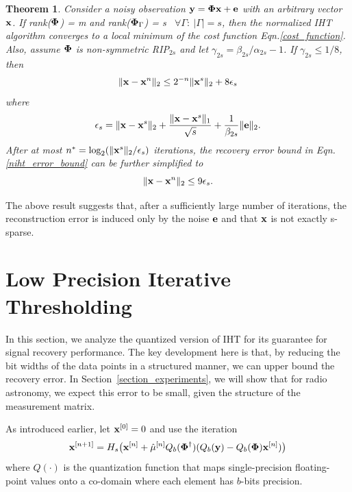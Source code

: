 \documentclass{article}
\newtheorem{theorem}{Theorem}
\begin{document}
\begin{theorem}\label{guarantee_niht}
{\rm{\cite{blumensath2010niht}}}
Consider a noisy observation ${\bf y} = {\bf \Phi x} + {\bf e}$ with an arbitrary vector ${\bf x}$. If rank({${\bf \Phi}$}) = m and rank(${\bf \Phi}_{\Gamma}$) = s \ $\forall \Gamma:\ |\Gamma| = s$, then the normalized IHT algorithm converges to a local minimum of the cost function Eqn.\ref{cost_function}. Also, assume ${\bf \Phi}$ is non-symmetric RIP$_{2s}$ and let $\gamma_{2s} = \beta_{2s}/\alpha_{2s}-1$. If $\gamma_{2s} \leq {1}/{8}$, then
\begin{equation}
    \| {\bf x}-{\bf x}^n\|_2 \leq 2^{-n}\| {\bf x}^s\|_2 + 8 {{\bf \epsilon}_s}\label{niht_error_bound}
\end{equation} where \begin{equation}
     {{\bf \epsilon}_s} =  \| {\bf x}-{\bf x}^s\|_2 + \frac{\| {\bf x}-{\bf x}^s\|_1}{\sqrt{s}}+\frac{1}{\beta_{2s}}\|{\bf e} \|_2.
\end{equation}
After at most $n^*=\log_2(\|{\bf x}^s\|_2/ {\bf \epsilon}_s)$ iterations, the recovery error bound in Eqn.\ref{niht_error_bound} can be further simplified to
\begin{equation}
   \| {\bf x}-{\bf x}^n\|_2 \leq 9 {{\bf \epsilon}_s}.
\end{equation}
\end{theorem}
The above result suggests that, after a sufficiently large number of iterations, the reconstruction error is induced only by the noise ${\bf e}$ and that ${\bf x}$ is not exactly s-sparse.

\section{Low Precision Iterative Thresholding}\label{section_lpiht}

In this section, we analyze the
quantized version of IHT for 
its guarantee for signal recovery performance.
The key development here is that, by reducing the bit widths of the data points in a structured manner, we
can upper bound the recovery error. 
In Section~\ref{section_experiments},
we will show that for radio astronomy,
we expect this error to be small, given
the structure of the measurement matrix.

As introduced earlier, let ${\bf x}^{[0]} = 0$ and use the iteration
\begin{equation} \label{modified_update_rule}
  {\bf x}^{[n+1]} = H_s\big({\bf x}^{[n]}+\hat{\mu}^{[n]} Q_b(\boldsymbol{\Phi}^{\dagger})(Q_b({\bf y})-Q_b(\boldsymbol{\Phi}){\bf x}^{[n]})\big)  
\end{equation}
where $Q(\cdot)$ is the quantization function that maps single-precision floating-point values onto a co-domain where each element has $b$-bits precision.
\end{document}
